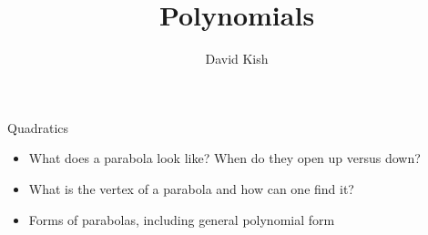 \documentclass{ximera}
\author{David Kish}
\title{Polynomials}
\begin{document}
\begin{abstract}
\end{abstract}
\maketitle


\begin{objectives}

\item Quadratics
\begin{itemize}
	\item What does a parabola look like?  When do they open up versus down?
	\item What is the vertex of a parabola and how can one find it?
	\item Forms of parabolas, including general polynomial form
\end{itemize}

\end{objectives}
\end{document}
